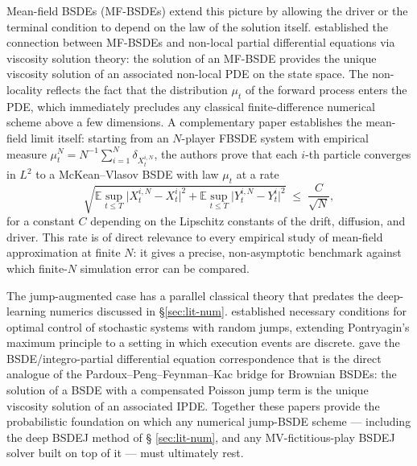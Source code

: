 Mean-field BSDEs (MF-BSDEs) extend this picture by allowing the
driver or the terminal condition to depend on the law of the
solution itself.  \citet{buckdahn2009viscosity} established the
connection between MF-BSDEs and non-local partial differential
equations via viscosity solution theory: the solution of an MF-BSDE
provides the unique viscosity solution of an associated non-local
PDE on the state space.  The non-locality reflects the fact that the
distribution $\mu_t$ of the forward process enters the PDE, which
immediately precludes any classical finite-difference numerical
scheme above a few dimensions.  A complementary paper
\citep{buckdahn2009limit} establishes the mean-field limit itself:
starting from an $N$-player FBSDE system with empirical measure
$\mu_t^N = N^{-1} \sum_{i=1}^N \delta_{X_t^{i,N}}$, the authors
prove that each $i$-th particle converges in $L^2$ to a
McKean--Vlasov BSDE with law $\mu_t$ at a rate
\[
  \sqrt{\mathbb{E} \sup_{t \leq T} \bigl|X_t^{i,N} - X_t^i\bigr|^2
  + \mathbb{E} \sup_{t \leq T} \bigl|Y_t^{i,N} - Y_t^i\bigr|^2 }
  \;\leq\; \frac{C}{\sqrt{N}},
\]
for a constant $C$ depending on the Lipschitz constants of the
drift, diffusion, and driver.  This rate is of direct relevance
to every empirical study of mean-field approximation at finite
$N$: it gives a precise, non-asymptotic benchmark against which
finite-$N$ simulation error can be compared.

The jump-augmented case has a parallel classical theory that
predates the deep-learning numerics discussed in \S\ref{sec:lit-num}.
\citet{tang1994} established necessary conditions for optimal
control of stochastic systems with random jumps, extending
Pontryagin's maximum principle to a setting in which execution events
are discrete.  \citet{barles1997} gave the BSDE/integro-partial
differential equation correspondence that is the direct analogue of
the Pardoux--Peng--Feynman--Kac bridge for Brownian BSDEs: the
solution of a BSDE with a compensated Poisson jump term is the
unique viscosity solution of an associated IPDE.  Together these
papers provide the probabilistic foundation on which any numerical
jump-BSDE scheme --- including the deep BSDEJ method of \S
\ref{sec:lit-num}, and any MV-fictitious-play BSDEJ solver built
on top of it --- must ultimately rest.

